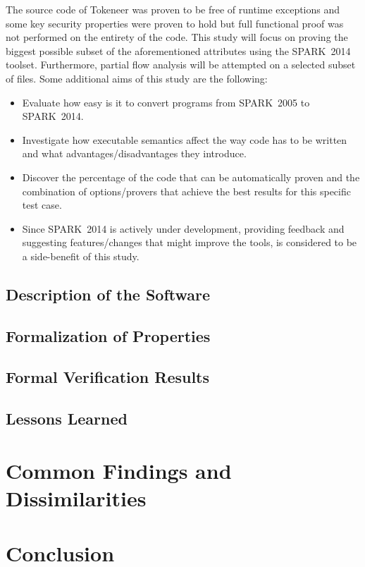 \documentclass{article}
\newcommand{\oldspark}{SPARK~2005\xspace}
\newcommand{\newspark}{SPARK~2014\xspace}
\begin{document}
The source code of Tokeneer was proven to be free of runtime exceptions
and some key security properties were proven to hold but full functional
proof was not performed on the entirety of the code. This study will
focus on proving the biggest possible subset of the aforementioned
attributes using the \newspark toolset. Furthermore, partial flow analysis
will be attempted on a selected subset of files. Some additional aims of this
study are the following:
\begin {itemize}
  \item Evaluate how easy is it to convert programs from \oldspark to \newspark.
  \item Investigate how executable semantics affect the way code has to be written
        and what advantages/disadvantages they introduce.
  \item Discover the percentage of the code that can be automatically proven
        and the combination of options/provers that achieve the best results
        for this specific test case.
  \item Since \newspark is actively under development, providing feedback and
        suggesting features/changes that might improve the tools, is considered
        to be a side-benefit of this study.
\end {itemize}





\subsection{Description of the Software}
\subsection{Formalization of Properties}
\subsection{Formal Verification Results}
\subsection{Lessons Learned}

\section{Common Findings and Dissimilarities}

\section{Conclusion}


\end{document}
